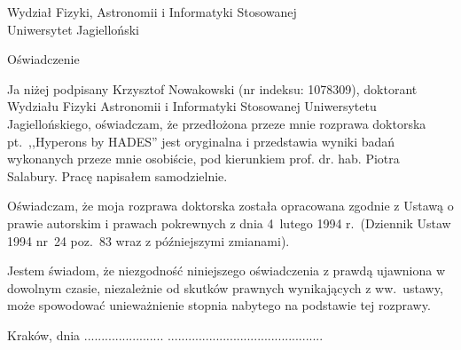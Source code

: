 \cleardoublepage %
\thispagestyle{plain}
\begingroup
{}

Wydział Fizyki, Astronomii i Informatyki Stosowanej\\
Uniwersytet Jagielloński\\

\vspace{2cm}

\begin{center}
  \LARGE Oświadczenie
\end{center}
\par
\vspace{3ex}
{\setlength{\parindent}{4ex}
Ja niżej podpisany Krzysztof Nowakowski (nr indeksu: 1078309), doktorant Wydziału Fizyki Astronomii i Informatyki Stosowanej Uniwersytetu Jagiellońskiego, oświadczam, że przedłożona przeze mnie rozprawa doktorska pt.\ ,,Hyperons by HADES'' jest oryginalna i przedstawia wyniki badań wykonanych przeze mnie osobiście, pod kierunkiem prof. dr. hab. Piotra Salabury. Pracę napisałem samodzielnie.

Oświadczam, że moja rozprawa doktorska została opracowana zgodnie z Ustawą o prawie autorskim i prawach pokrewnych z dnia 4~lutego 1994 r.\ (Dziennik Ustaw 1994 nr~24 poz.~83 wraz z późniejszymi zmianami).

Jestem świadom, że niezgodność niniejszego oświadczenia z prawdą ujawniona w dowolnym czasie, niezależnie od skutków prawnych wynikających z ww.~ustawy, może spowodować unieważnienie stopnia nabytego na podstawie tej rozprawy.
}
\vspace{8ex}

Kraków, dnia ....................... \hfill .............................................

\par
\endgroup
{}
\vfill